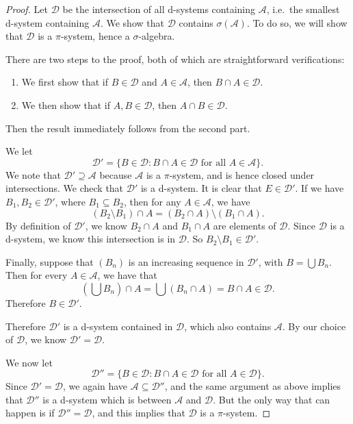 \documentclass[a4paper]{article}
\begin{document}
\begin{proof}
  Let $\mathcal{D}$ be the intersection of all d-systems containing $\mathcal{A}$, i.e.\ the smallest d-system containing $\mathcal{A}$. We show that $\mathcal{D}$ contains $\sigma(\mathcal{A})$. To do so, we will show that $\mathcal{D}$ is a $\pi$-system, hence a $\sigma$-algebra.

  There are two steps to the proof, both of which are straightforward verifications:
  \begin{enumerate}
    \item We first show that if $B \in \mathcal{D}$ and $A \in \mathcal{A}$, then $B \cap A \in \mathcal{D}$.
    \item We then show that if $A, B \in \mathcal{D}$, then $A \cap B \in \mathcal{D}$.
  \end{enumerate}
  Then the result immediately follows from the second part.

  We let
  \[
    \mathcal{D}' = \{ B \in \mathcal{D}: B \cap A \in \mathcal{D}\text{ for all }A \in \mathcal{A}\}.
  \]
  We note that $\mathcal{D}' \supseteq \mathcal{A}$ because $\mathcal{A}$ is a $\pi$-system, and is hence closed under intersections. We check that $\mathcal{D}'$ is a d-system. It is clear that $E \in \mathcal{D}'$. If we have $B_1, B_2 \in \mathcal{D}'$, where $B_1 \subseteq B_2$, then for any $A \in \mathcal{A}$, we have
  \[
    (B_2 \setminus B_1) \cap A = (B_2 \cap A) \setminus (B_1 \cap A).
  \]
  By definition of $\mathcal{D}'$, we know $B_2 \cap A$ and $B_1 \cap A$ are elements of $\mathcal{D}$. Since $\mathcal{D}$ is a d-system, we know this intersection is in $\mathcal{D}$. So $B_2 \setminus B_1 \in \mathcal{D}'$.

  Finally, suppose that $(B_n)$ is an increasing sequence in $\mathcal{D}'$, with $B = \bigcup B_n$. Then for every $A \in \mathcal{A}$, we have that
  \[
    \left(\bigcup B_n\right) \cap A = \bigcup (B_n \cap A) = B \cap A \in \mathcal{D}.
  \]
  Therefore $B \in \mathcal{D}'$.

  Therefore $\mathcal{D}'$ is a d-system contained in $\mathcal{D}$, which also contains $\mathcal{A}$. By our choice of $\mathcal{D}$, we know $\mathcal{D}' = \mathcal{D}$.

  We now let
  \[
    \mathcal{D}'' = \{B \in \mathcal{D}: B \cap A \in \mathcal{D}\text{ for all }A \in \mathcal{D}\}.
  \]
  Since $\mathcal{D}' = \mathcal{D}$, we again have $\mathcal{A} \subseteq \mathcal{D}''$, and the same argument as above implies that $\mathcal{D}''$ is a d-system which is between $\mathcal{A}$ and $\mathcal{D}$. But the only way that can happen is if $\mathcal{D}'' = \mathcal{D}$, and this implies that $\mathcal{D}$ is a $\pi$-system.
\end{proof}
\end{document}
